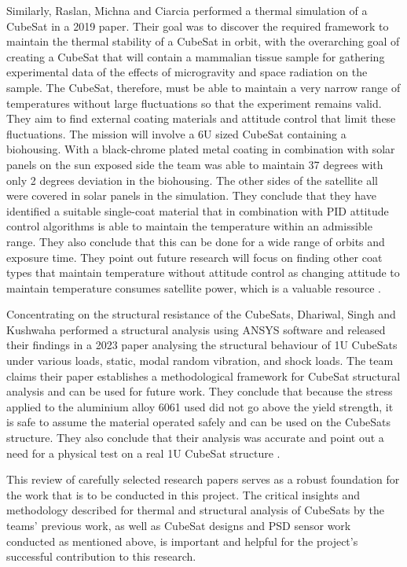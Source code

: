 Similarly, Raslan, Michna and Ciarcia performed a thermal simulation of a CubeSat in a 2019 paper. Their goal was to discover the required framework to maintain the thermal stability of a CubeSat in orbit, with the overarching goal of creating a CubeSat that will contain a mammalian tissue sample for gathering experimental data of the effects of microgravity and space radiation on the sample. The CubeSat, therefore, must be able to maintain a very narrow range of temperatures without large fluctuations so that the experiment remains valid. They aim to find external coating materials and attitude control that limit these fluctuations. The mission will involve a 6U sized CubeSat containing a biohousing. With a black-chrome plated metal coating in combination with solar panels on the sun exposed side the team was able to maintain 37 degrees with only 2 degrees deviation in the biohousing. The other sides of the satellite all were covered in solar panels in the simulation. They conclude that they have identified a suitable single-coat material that in combination with PID attitude control algorithms is able to maintain the temperature within an admissible range. They also conclude that this can be done for a wide range of orbits and exposure time. They point out future research will focus on finding other coat types that maintain temperature without attitude control as changing attitude to maintain temperature consumes satellite power, which is a valuable resource \cite{Raslan2019}.

Concentrating on the structural resistance of the CubeSats, Dhariwal, Singh and Kushwaha performed a structural analysis using ANSYS software and released their findings in a 2023 paper analysing the structural behaviour of 1U CubeSats under various loads, static, modal random vibration, and shock loads. The team claims their paper establishes a methodological framework for CubeSat structural analysis and can be used for future work. They conclude that because the stress applied to the aluminium alloy 6061 used did not go above the yield strength, it is safe to assume the material operated safely and can be used on the CubeSats structure. They also conclude that their analysis was accurate and point out a need for a physical test on a real 1U CubeSat structure \cite{Dhariwal2023}.

This review of carefully selected research papers serves as a robust foundation for the work that is to be conducted in this project. The critical insights and methodology described for thermal and structural analysis of CubeSats by the teams' previous work, as well as CubeSat designs and PSD sensor work conducted as mentioned above, is important and helpful for the project's successful contribution to this research.

